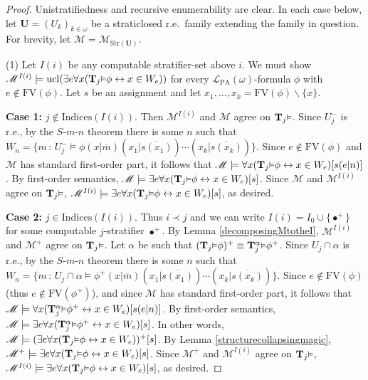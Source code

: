 \documentclass[reqno]{article}
\theoremstyle{definition}
\def\L{\mathscr{L}}
\def\M{\mathscr{M}}
\def\T{\mathbf{T}}
\def\U{\mathbf{U}}
\def\indices{\mathrm{Indices}}
\def\FV{\mathrm{FV}}
\def\LPA{\L_{\mathrm{PA}}}
\renewcommand{\Pr}[1]{\T_{#1}\mbox{\small${\vDash}$}}
\newcommand{\Prr}[2]{\T^{#1}_{#2}\mbox{\small${\vDash}$}}
\newcommand{\ucl}[1]{\mathrm{ucl}(#1)}
\newcommand{\case}[1]{\textbf{Case #1:}}
\newcommand{\str}[1]{\mathrm{Str}(#1)} \newcommand{\Str}[1]{\str{#1}}
\begin{document}
\begin{proof}
Unistratifiedness and recursive enumerability are clear.
In each case below, let $\U=(U_k)_{k\in\omega}$ be a straticlosed r.e.~family
extending the family in question. For brevity, let $\M=\M_{\str\U}$.

\item
(1)
Let $I(i)$ be any computable stratifier-set above $i$.
We must show $\M^{I(i)}\models\ucl{\exists e\forall x(\Pr j\phi \leftrightarrow
x\in W_e)}$ for every $\LPA(\omega)$-formula $\phi$ with $e\not\in\FV(\phi)$.
Let $s$ be an assignment and let $x_1,\ldots,x_k=\FV(\phi)\backslash \{x\}$.

\item
\case1
$j\not\in \indices(I(i))$.
Then $\M^{I(i)}$ and $\M$ agree on $\Pr j$.
Since $U^-_j$ is r.e., by the $S$-$m$-$n$ theorem there is some $n$ such that
$W_n=\{m\,:\,U^-_j\models \phi(x|\overline m)(x_1|\overline{s(x_1)})\cdots
(x_k|\overline{s(x_k)})\}$.
Since $e\not\in\FV(\phi)$ and $\M$ has standard first-order part, it follows
that $\M\models \forall x(\Pr j \phi\leftrightarrow x\in W_e)[s(e|n)]$.
By first-order semantics,
$\M\models \exists e\forall x(\Pr j\phi\leftrightarrow x\in W_e)[s]$.
Since $\M$ and $\M^{I(i)}$ agree on $\Pr j$,
$\M^{I(i)}\models \exists e\forall x(\Pr j\phi\leftrightarrow x\in W_e)[s]$,
as desired.

\item
\case2
$j\in\indices(I(i))$.
Thus $i\prec j$ and we can write $I(i)=I_0\cup\{\bullet^+\}$
for some computable $j$-stratifier $\bullet^+$.
By Lemma \ref{decomposingMtotheI}, $\M^{I(i)}$ and
$\M^+$ agree on $\Pr j$.
Let $\alpha$ be such that $(\Pr j\phi)^+\equiv \Prr\alpha j\phi^+$.
Since $U_j\cap\alpha$ is r.e., by the $S$-$m$-$n$ theorem there is some $n$ such that
$W_n=\{m\,:\,U_j\cap\alpha\models\phi^+(x|\overline m)(x_1|\overline{s(x_1)})\cdots
(x_k|\overline{s(x_k)})\}$.
Since $e\not\in\FV(\phi)$ (thus $e\not\in\FV(\phi^+)$), and since $\M$ has standard
first-order part, it follows that
$\M\models \forall x(\Prr\alpha j\phi^+\leftrightarrow x\in W_e)[s(e|n)]$.
By first-order semantics,
$\M\models\exists e\forall x(\Prr\alpha j\phi^+\leftrightarrow x\in W_e)[s]$.
In other words,
$\M\models(\exists e\forall x(\Pr j\phi\leftrightarrow x\in W_e))^+[s]$.
By Lemma \ref{structurecollapsingmagic},
$\M^+\models \exists e\forall x(\Pr j\phi\leftrightarrow x\in W_e)[s]$.
Since $\M^+$ and $\M^{I(i)}$ agree on $\Pr j$,
$\M^{I(i)}\models \exists e\forall x(\Pr j\phi\leftrightarrow x\in W_e)[s]$,
as desired.


\end{proof}
\end{document}
